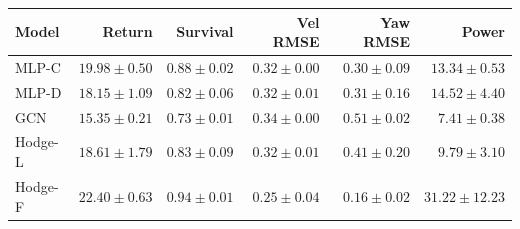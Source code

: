 \begin{tabular}{lrrrrr}
\toprule
Model & Return & Survival & Vel RMSE & Yaw RMSE & Power \\
\midrule
MLP-C & $19.98 \pm 0.50$ & $0.88 \pm 0.02$ & $0.32 \pm 0.00$ & $0.30 \pm 0.09$ & $13.34 \pm 0.53$ \\
MLP-D & $18.15 \pm 1.09$ & $0.82 \pm 0.06$ & $0.32 \pm 0.01$ & $0.31 \pm 0.16$ & $14.52 \pm 4.40$ \\
GCN & $15.35 \pm 0.21$ & $0.73 \pm 0.01$ & $0.34 \pm 0.00$ & $0.51 \pm 0.02$ & $7.41 \pm 0.38$ \\
Hodge-L & $18.61 \pm 1.79$ & $0.83 \pm 0.09$ & $0.32 \pm 0.01$ & $0.41 \pm 0.20$ & $9.79 \pm 3.10$ \\
Hodge-F & $22.40 \pm 0.63$ & $0.94 \pm 0.01$ & $0.25 \pm 0.04$ & $0.16 \pm 0.02$ & $31.22 \pm 12.23$ \\
\bottomrule
\end{tabular}